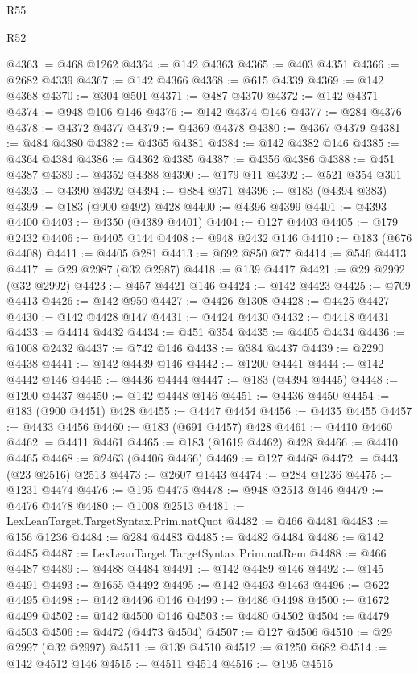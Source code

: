 \begin{lexlean}{R55}
\begin{lexlean}{R52}
\begin{coremodule}
{{{{{{{{{{{{{{{{{{{{{{{{{{{{{{{{{{{{{{{{{{{{{{{{{{{{{{{{{{{{{{{{{{{{{{{{{{{{{{{{{{{{{{{{{{{{{{{{{{{{{{{{{{{{{{{{{{{{{{{{{{{{{{{{{{{{{{{{{{{{{{{{{{{{{{{{{{{{{{{{{{{{{{{{{{{{{{{{{{{{{{{{{{{{{{{{{{{{{{@4363 := @468 @1262
@4364 := @142 @4363
@4365 := @403 @4351
@4366 := @2682 @4339
@4367 := @142 @4366
@4368 := @615 @4339
@4369 := @142 @4368
@4370 := @304 @501
@4371 := @487 @4370
@4372 := @142 @4371
@4374 := @948 @106 @146
@4376 := @142 @4374 @146
@4377 := @284 @4376
@4378 := @4372 @4377
@4379 := @4369 @4378
@4380 := @4367 @4379
@4381 := @484 @4380
@4382 := @4365 @4381
@4384 := @142 @4382 @146
@4385 := @4364 @4384
@4386 := @4362 @4385
@4387 := @4356 @4386
@4388 := @451 @4387
@4389 := @4352 @4388
@4390 := @179 @11
@4392 := @521 @354 @301
@4393 := @4390 @4392
@4394 := @884 @371
@4396 := @183 (@4394 @383)
@4399 := @183 (@900 @492) @428
@4400 := @4396 @4399
@4401 := @4393 @4400
@4403 := @4350 (@4389 @4401)
@4404 := @127 @4403
@4405 := @179 @2432
@4406 := @4405 @144
@4408 := @948 @2432 @146
@4410 := @183 (@676 @4408)
@4411 := @4405 @281
@4413 := @692 @850 @77
@4414 := @546 @4413
@4417 := @29 @2987 (@32 @2987)
@4418 := @139 @4417
@4421 := @29 @2992 (@32 @2992)
@4423 := @457 @4421 @146
@4424 := @142 @4423
@4425 := @709 @4413
@4426 := @142 @950
@4427 := @4426 @1308
@4428 := @4425 @4427
@4430 := @142 @4428 @147
@4431 := @4424 @4430
@4432 := @4418 @4431
@4433 := @4414 @4432
@4434 := @451 @354
@4435 := @4405 @4434
@4436 := @1008 @2432
@4437 := @742 @146
@4438 := @384 @4437
@4439 := @2290 @4438
@4441 := @142 @4439 @146
@4442 := @1200 @4441
@4444 := @142 @4442 @146
@4445 := @4436 @4444
@4447 := @183 (@4394 @4445)
@4448 := @1200 @4437
@4450 := @142 @4448 @146
@4451 := @4436 @4450
@4454 := @183 (@900 @4451) @428
@4455 := @4447 @4454
@4456 := @4435 @4455
@4457 := @4433 @4456
@4460 := @183 (@691 @4457) @428
@4461 := @4410 @4460
@4462 := @4411 @4461
@4465 := @183 (@1619 @4462) @428
@4466 := @4410 @4465
@4468 := @2463 (@4406 @4466)
@4469 := @127 @4468
@4472 := @443 (@23 @2516) @2513
@4473 := @2607 @1443
@4474 := @284 @1236
@4475 := @1231 @4474
@4476 := @195 @4475
@4478 := @948 @2513 @146
@4479 := @4476 @4478
@4480 := @1008 @2513
@4481 := LexLeanTarget.TargetSyntax.Prim.natQuot
@4482 := @466 @4481
@4483 := @156 @1236
@4484 := @284 @4483
@4485 := @4482 @4484
@4486 := @142 @4485
@4487 := LexLeanTarget.TargetSyntax.Prim.natRem
@4488 := @466 @4487
@4489 := @4488 @4484
@4491 := @142 @4489 @146
@4492 := @145 @4491
@4493 := @1655 @4492
@4495 := @142 @4493 @1463
@4496 := @622 @4495
@4498 := @142 @4496 @146
@4499 := @4486 @4498
@4500 := @1672 @4499
@4502 := @142 @4500 @146
@4503 := @4480 @4502
@4504 := @4479 @4503
@4506 := @4472 (@4473 @4504)
@4507 := @127 @4506
@4510 := @29 @2997 (@32 @2997)
@4511 := @139 @4510
@4512 := @1250 @682
@4514 := @142 @4512 @146
@4515 := @4511 @4514
@4516 := @195 @4515
}}}}}}}}}}}}}}}}}}}}}}}}}}}}}}}}}}}}}}}}}}}}}}}}}}}}}}}}}}}}}}}}}}}}}}}}}}}}}}}}}}}}}}}}}}}}}}}}}}}}}}}}}}}}}}}}}}}}}}}}}}}}}}}}}}}}}}}}}}}}}}}}}}}}}}}}}}}}}}}}}}}}}}}}}}}}}}}}}}}}}}}}}}}}}}}}}}}}}}
\end{coremodule}
\end{lexlean}
\end{lexlean}
